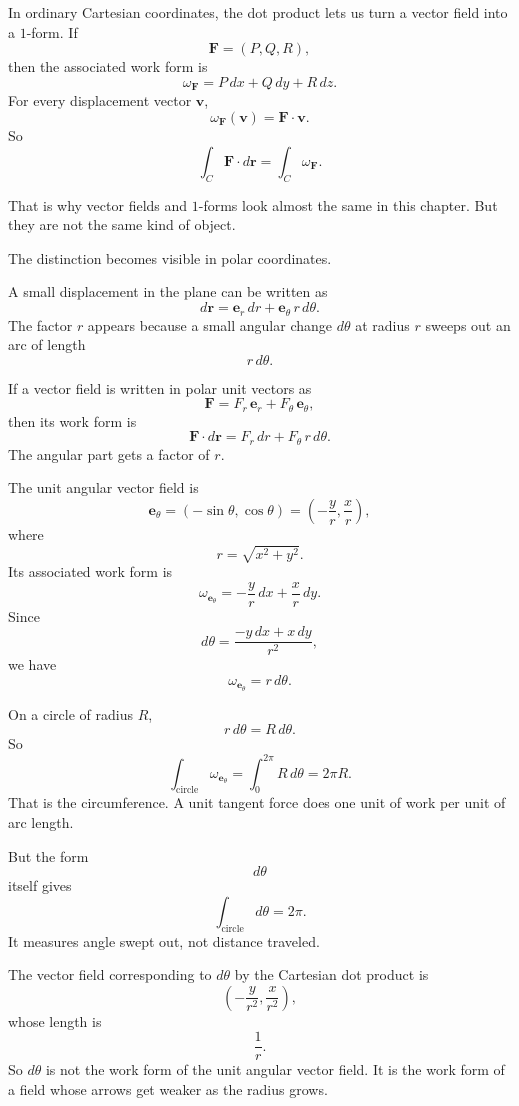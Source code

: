 In ordinary Cartesian coordinates, the dot product lets us turn a vector field into a
\(1\)-form.  If
\[
    \mathbf F=(P,Q,R),
\]
then the associated work form is
\[
\boxed{
    \omega_{\mathbf F}=P\,dx+Q\,dy+R\,dz.
}
\]
For every displacement vector \(\mathbf v\),
\[
    \omega_{\mathbf F}(\mathbf v)=\mathbf F\cdot\mathbf v.
\]
So
\[
\boxed{
    \int_C \mathbf F\cdot d\mathbf r
    =
    \int_C \omega_{\mathbf F}.
}
\]

That is why vector fields and \(1\)-forms look almost the same in this chapter.  But
they are not the same kind of object.

The distinction becomes visible in polar coordinates.

A small displacement in the plane can be written as
\[
    d\mathbf r=\mathbf e_r\,dr+\mathbf e_\theta\,r\,d\theta.
\]
The factor \(r\) appears because a small angular change \(d\theta\) at radius \(r\) sweeps
out an arc of length
\[
    r\,d\theta.
\]

If a vector field is written in polar unit vectors as
\[
    \mathbf F=F_r\,\mathbf e_r+F_\theta\,\mathbf e_\theta,
\]
then its work form is
\[
\boxed{
    \mathbf F\cdot d\mathbf r
    =
    F_r\,dr+F_\theta\,r\,d\theta.
}
\]
The angular part gets a factor of \(r\).

\begin{example}
The unit angular vector field is
\[
    \mathbf e_\theta=(-\sin\theta,\cos\theta)
    =
    \left(-\frac{y}{r},\frac{x}{r}\right),
\]
where
\[
    r=\sqrt{x^2+y^2}.
\]
Its associated work form is
\[
    \omega_{\mathbf e_\theta}
    =
    -\frac{y}{r}\,dx+\frac{x}{r}\,dy.
\]
Since
\[
    d\theta=
    \frac{-y\,dx+x\,dy}{r^2},
\]
we have
\[
\boxed{
    \omega_{\mathbf e_\theta}=r\,d\theta.
}
\]

On a circle of radius \(R\),
\[
    r\,d\theta=R\,d\theta.
\]
So
\[
    \int_{\text{circle}} \omega_{\mathbf e_\theta}
    =
    \int_0^{2\pi}R\,d\theta
    =
    2\pi R.
\]
That is the circumference.  A unit tangent force does one unit of work per unit of arc
length.

But the form
\[
    d\theta
\]
itself gives
\[
    \int_{\text{circle}}d\theta=2\pi.
\]
It measures angle swept out, not distance traveled.

The vector field corresponding to \(d\theta\) by the Cartesian dot product is
\[
    \left(-\frac{y}{r^2},\frac{x}{r^2}\right),
\]
whose length is
\[
    \frac1r.
\]
So \(d\theta\) is not the work form of the unit angular vector field.  It is the work form
of a field whose arrows get weaker as the radius grows.
\end{example}

